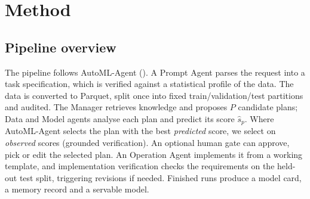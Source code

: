 \section{Method}
\label{sec:method}

\subsection{Pipeline overview}
The pipeline follows AutoML-Agent (). A Prompt Agent parses the request into a task specification, which is verified against a statistical profile of the data. The data is converted to Parquet, split once into fixed train/validation/test partitions and audited. The Manager retrieves knowledge and proposes $P$ candidate plans; Data and Model agents analyse each plan and predict its score $\hat{s}_p$. Where AutoML-Agent selects the plan with the best \emph{predicted} score, we select on \emph{observed} scores (grounded verification). An optional human gate can approve, pick or edit the selected plan. An Operation Agent implements it from a working template, and implementation verification checks the requirements on the held-out test split, triggering revisions if needed. Finished runs produce a model card, a memory record and a servable model.


